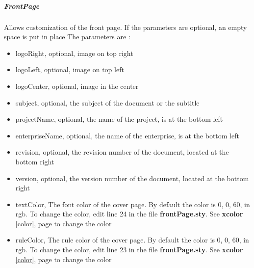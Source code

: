 \subparagraph{FrontPage}
Allows customization of the front page. If the parameters are optional, an empty space is put in
place
The parameters are :
\begin{itemize}
    \item logoRight, optional, image on top right
    \item logoLeft, optional, image on top left
    \item logoCenter, optional, image in the center
    \item subject, optional, the subject of the document or the subtitle
    \item projectName, optional, the name of the project, is at the bottom left
    \item enterpriseName, optional, the name of the enterprise, is at the bottom left
    \item revision, optional, the revision number of the document, located at the bottom right
    \item version, optional, the version number of the document, located at the bottom right
    \item textColor, The font color of the cover page. By default the color is 0, 0, 60, in rgb.
          To change the color, edit line 24 in the file \textbf{frontPage.sty}. See \textbf{xcolor}
          \ref{color}, page \pageref{color} to change the color
    \item ruleColor, The rule color of the cover page. By default the color is 0, 0, 60, in rgb. To
          change the color, edit line 23 in the file \textbf{frontPage.sty}. See \textbf{xcolor}
          \ref{color}, page \pageref{color} to change the color
\end{itemize}

